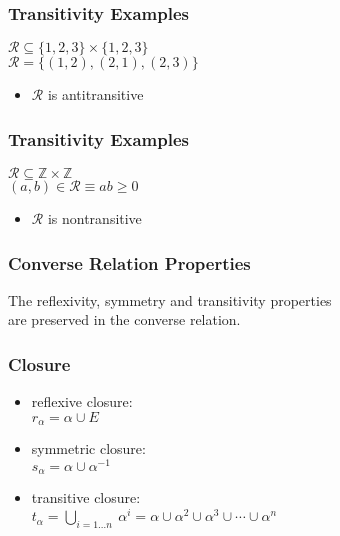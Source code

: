 \documentclass[dvipsnames]{beamer}
\begin{document}
\begin{frame}
  \frametitle{Transitivity Examples}

  \begin{example}
    $\mathcal{R} \subseteq \{1,2,3\} \times \{1,2,3\}$\\
    $\mathcal{R} = \{(1,2), (2,1), (2,3)\}$

    \medskip
    \begin{itemize}
      \item $\mathcal{R}$ is antitransitive
    \end{itemize}
  \end{example}
\end{frame}

\begin{frame}
  \frametitle{Transitivity Examples}

  \begin{example}
    $\mathcal{R} \subseteq \mathbb{Z} \times \mathbb{Z}$\\
    $(a,b) \in \mathcal{R} \equiv ab \geq 0$

    \medskip
    \begin{itemize}
      \item $\mathcal{R}$ is nontransitive
    \end{itemize}
  \end{example}
\end{frame}

\begin{frame}
  \frametitle{Converse Relation Properties}

  \begin{theorem}
    The reflexivity, symmetry and transitivity properties\\
    are preserved in the converse relation.
  \end{theorem}
\end{frame}

\begin{frame}
  \frametitle{Closure}

  \begin{itemize}
    \item reflexive closure:\\
      $r_{\alpha} = \alpha \cup E$

    \pause
    \medskip
    \item symmetric closure:\\
      $s_{\alpha} = \alpha \cup \alpha^{-1}$

    \pause
    \medskip
    \item transitive closure:\\
      $t_{\alpha} = \bigcup_{i=1 \dots n}~\alpha^i
        = \alpha \cup \alpha^2 \cup \alpha^3 \cup \cdots \cup \alpha^n$
  \end{itemize}
\end{frame}
\end{document}
